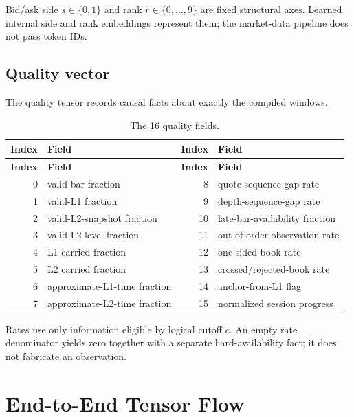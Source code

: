 \documentclass[10pt,letterpaper]{article}
\numberwithin{equation}{section}
\theoremstyle{definition}
\theoremstyle{remark}
\begin{document}
Bid/ask side $s\in\{0,1\}$ and rank $r\in\{0,\ldots,9\}$ are fixed
structural axes. Learned internal side and rank embeddings represent them; the
market-data pipeline does not pass token IDs.

\subsection{Quality vector}

The quality tensor records causal facts about exactly the compiled windows.

\begin{longtable}{@{}r p{6.1cm} r p{6.1cm}@{}}
\caption{The 16 quality fields.}\label{tab:quality-fields}\\
\toprule
\textbf{Index} & \textbf{Field} & \textbf{Index} & \textbf{Field}\\
\midrule
\endfirsthead
\toprule
\textbf{Index} & \textbf{Field} & \textbf{Index} & \textbf{Field}\\
\midrule
\endhead
0 & valid-bar fraction & 8 & quote-sequence-gap rate\\
1 & valid-L1 fraction & 9 & depth-sequence-gap rate\\
2 & valid-L2-snapshot fraction & 10 & late-bar-availability fraction\\
3 & valid-L2-level fraction & 11 & out-of-order-observation rate\\
4 & L1 carried fraction & 12 & one-sided-book rate\\
5 & L2 carried fraction & 13 & crossed/rejected-book rate\\
6 & approximate-L1-time fraction & 14 & anchor-from-L1 flag\\
7 & approximate-L2-time fraction & 15 & normalized session progress\\
\bottomrule
\end{longtable}

Rates use only information eligible by logical cutoff \(c\). An empty rate denominator yields
zero together with a separate hard-availability fact; it does not fabricate an
observation.

\section{End-to-End Tensor Flow}
\end{document}
